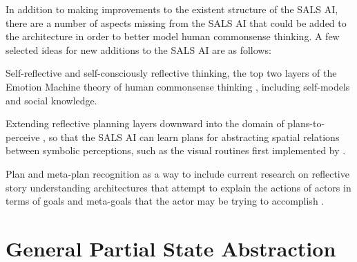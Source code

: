 In addition to making improvements to the existent structure of the
SALS AI, there are a number of aspects missing from the SALS AI that
could be added to the architecture in order to better model human
commonsense thinking.  A few selected ideas for new additions to the
SALS AI are as follows:
\begin{packed_enumerate}
\item{Self-reflective and self-consciously reflective thinking, the
  top two layers of the Emotion Machine theory of human commonsense
  thinking \cite[]{minsky:2006}, including self-models and social
  knowledge.}
\item{Extending reflective planning layers downward into the domain of
  plans-to-perceive \cite[]{pryor:1992,pryorcollins:1995,velez:2011},
  so that the SALS AI can learn plans for abstracting spatial
  relations between symbolic perceptions, such as the visual routines
  first implemented by \cite{ullman:1984}.}
\item{Plan and meta-plan recognition as a way to include current
  research on reflective story understanding architectures that
  attempt to explain the actions of actors in terms of goals and
  meta-goals that the actor may be trying to accomplish
  \cite[]{wilensky:1981,cox:1999b,cox:2010,winston:2011}.}
\end{packed_enumerate}

\section{General Partial State Abstraction}

